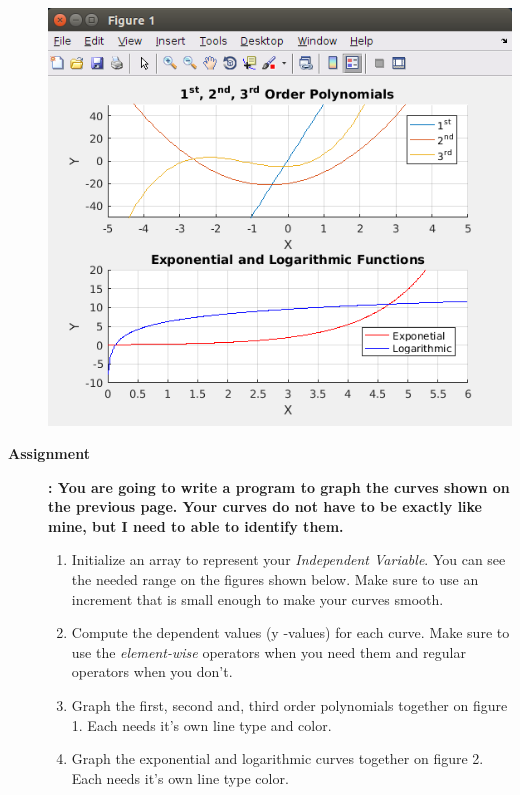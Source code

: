 \documentclass[11pt]{article}
\begin{document}
\begin{description}
\includegraphics[scale=1]{lab5_fig1.png}\\

	\newpage
	\item [\textbf{ \Large Assignment}] \textbf{ \Large : You are going to write a program to graph the curves shown on the previous page. Your curves do not have to be exactly like mine, but I need to able to identify them. }\\
	\Large
        \begin{enumerate}

	
	
	\item Initialize an array to represent your {\it Independent Variable}. You can see the needed range on the figures shown below. Make sure to use an increment that is small enough to make your curves smooth.\\
		
	\item Compute the dependent values (y -values) for each curve. Make sure  to use the {\it element-wise} operators when you need them and regular operators when you don't.  \\
		
	\item Graph the first, second and, third order polynomials together on figure 1. Each needs it's own line type and color. \\

	\item Graph the exponential and logarithmic curves together on figure 2. Each needs it's own line type color.\\
 

\end{enumerate}
\end{description}
\end{document}
